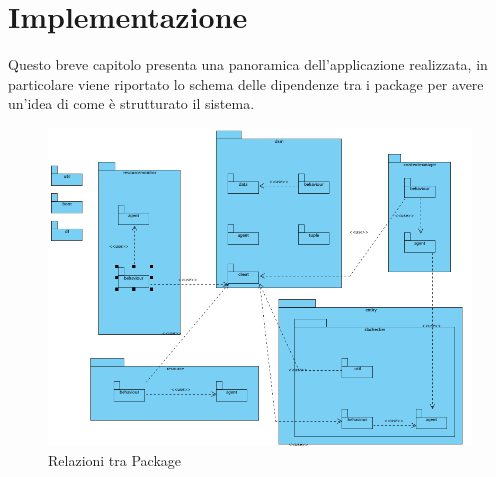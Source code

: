 \chapter{Implementazione}
Questo breve capitolo presenta una panoramica dell'applicazione realizzata, in particolare viene riportato lo schema  delle dipendenze tra i package per avere un'idea di come è strutturato il sistema.
\begin{figure}[H]
\begin{center}
\includegraphics[scale=0.4]{etc/diagramm1.png}
\caption{Relazioni tra Package}
\label{fig:package}
\end{center}
\end{figure}